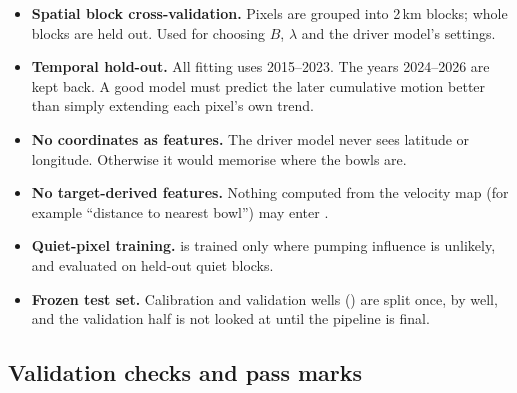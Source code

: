 \begin{itemize}
\item \textbf{Spatial block cross-validation.} Pixels are grouped into 2\,km blocks; whole blocks are
held out. Used for choosing $B$, $\lambda$ and the driver model's settings.
\item \textbf{Temporal hold-out.} All fitting uses 2015--2023. The years 2024--2026 are kept back.
A good model must predict the later cumulative motion better than simply extending each pixel's own
trend.
\item \textbf{No coordinates as features.} The driver model never sees latitude or longitude.
Otherwise it would memorise where the bowls are.
\item \textbf{No target-derived features.} Nothing computed from the velocity map (for example
``distance to nearest bowl'') may enter .
\item \textbf{Quiet-pixel training.}  is trained only where pumping influence is unlikely, and
evaluated on held-out quiet blocks.
\item \textbf{Frozen test set.} Calibration and validation wells () are split once, by well, and
the validation half is not looked at until the pipeline is final.
\end{itemize}

\subsection{Validation checks and pass marks}

